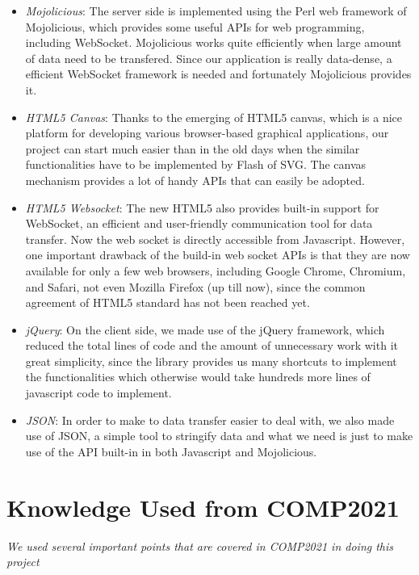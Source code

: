 \documentclass[a4paper,11pt,3p]{article}
\begin{document}
\begin{itemize}
\item
\emph{Mojolicious}: The server side is implemented using the Perl web framework of Mojolicious,
which provides some useful APIs for web programming, including WebSocket.
Mojolicious works quite efficiently when large amount of data need to be
transfered. Since our application is really data-dense, a efficient WebSocket 
framework is needed and fortunately Mojolicious provides it.\\

\item
\emph{HTML5 Canvas}: Thanks to the emerging of HTML5 canvas, which is a nice platform for
developing various browser-based graphical applications, our project can start
much easier than in the old days when the similar functionalities have to be
implemented by Flash of SVG. The canvas mechanism provides a lot of handy APIs
that can easily be adopted.\\

\item
\emph{HTML5 Websocket}: The new HTML5 also provides built-in support for WebSocket, an
efficient and user-friendly communication tool for data transfer. Now the web
socket is directly accessible from Javascript. However, one important drawback
of the build-in web socket APIs is that they are now available for only a few
web browsers, including Google Chrome, Chromium, and Safari, not even
Mozilla Firefox (up till now), since the common agreement of HTML5 standard
has not been reached yet.\\

\item
\emph{jQuery}: On the client side, we made use of the jQuery framework, which 
reduced the total lines of code and the amount of unnecessary work with it great simplicity, 
since the library provides us many shortcuts to implement the functionalities which 
otherwise would take hundreds more lines of javascript code to implement.\\

\item
\emph{JSON}: In order to make to data transfer easier to deal with, we also made use of JSON, 
a simple tool to stringify data and what we need is just to make use of the API 
built-in in both Javascript and Mojolicious.\\
\end{itemize}

\section{Knowledge Used from COMP2021}
\emph{We used several important points that are covered in COMP2021 in doing this project}\\
\end{document}
